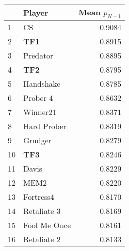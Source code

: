 \begin{tabular}{llr}
\toprule
{} &        Player &  Mean $p_{N-1}$ \\
\midrule
1  &            CS &          0.9084 \\
2  &           \textbf{TF1} &          0.8915 \\
3  &      Predator &          0.8895 \\
4  &           \textbf{TF2} &          0.8795 \\
5  &     Handshake &          0.8785 \\
6  &      Prober 4 &          0.8632 \\
7  &      Winner21 &          0.8371 \\
8  &   Hard Prober &          0.8319 \\
9  &       Grudger &          0.8279 \\
10 &           \textbf{TF3} &          0.8246 \\
11 &         Davis &          0.8229 \\
12 &          MEM2 &          0.8220 \\
13 &     Fortress4 &          0.8170 \\
14 &   Retaliate 3 &          0.8169 \\
15 &  Fool Me Once &          0.8161 \\
16 &   Retaliate 2 &          0.8133 \\
\bottomrule
\end{tabular}
